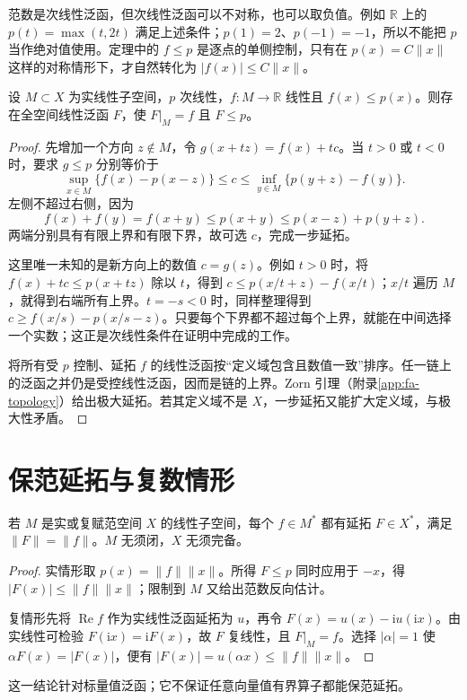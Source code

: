 \documentclass[UTF8,12pt,a4paper,fontset=fandol]{ctexbook}
\begin{document}
范数是次线性泛函，但次线性泛函可以不对称，也可以取负值。例如 $\mathbb R$ 上的 $p(t)=\max(t,2t)$ 满足上述条件；$p(1)=2$、$p(-1)=-1$，所以不能把 $p$ 当作绝对值使用。定理中的 $f\leq p$ 是逐点的单侧控制，只有在 $p(x)=C\|x\|$ 这样的对称情形下，才自然转化为 $|f(x)|\leq C\|x\|$。
\begin{theorem}\label{thm:fa-hahn-banach-real}
设 $M\subset X$ 为实线性子空间，$p$ 次线性，$f:M\to\mathbb R$ 线性且 $f(x)\leq p(x)$。则存在全空间线性泛函 $F$，使 $F|_M=f$ 且 $F\leq p$。
\end{theorem}
\begin{proof}
先增加一个方向 $z\notin M$，令 $g(x+tz)=f(x)+tc$。当 $t>0$ 或 $t<0$ 时，要求 $g\leq p$ 分别等价于
\[
 \sup_{x\in M}\{f(x)-p(x-z)\}\leq c
 \leq\inf_{y\in M}\{p(y+z)-f(y)\}.
\]
左侧不超过右侧，因为
\[
 f(x)+f(y)=f(x+y)\leq p(x+y)\leq p(x-z)+p(y+z).
\]
两端分别具有有限上界和有限下界，故可选 $c$，完成一步延拓。

这里唯一未知的是新方向上的数值 $c=g(z)$。例如 $t>0$ 时，将 $f(x)+tc\leq p(x+tz)$ 除以 $t$，得到 $c\leq p(x/t+z)-f(x/t)$；$x/t$ 遍历 $M$，就得到右端所有上界。$t=-s<0$ 时，同样整理得到 $c\geq f(x/s)-p(x/s-z)$。只要每个下界都不超过每个上界，就能在中间选择一个实数；这正是次线性条件在证明中完成的工作。

将所有受 $p$ 控制、延拓 $f$ 的线性泛函按“定义域包含且数值一致”排序。任一链上的泛函之并仍是受控线性泛函，因而是链的上界。Zorn 引理（附录\ref{app:fa-topology}）给出极大延拓。若其定义域不是 $X$，一步延拓又能扩大定义域，与极大性矛盾。
\end{proof}

\section{保范延拓与复数情形}
\begin{corollary}\label{cor:fa-norm-preserving-extension}
若 $M$ 是实或复赋范空间 $X$ 的线性子空间，每个 $f\in M^*$ 都有延拓 $F\in X^*$，满足 $\|F\|=\|f\|$。$M$ 无须闭，$X$ 无须完备。
\end{corollary}
\begin{proof}
实情形取 $p(x)=\|f\|\|x\|$。所得 $F\leq p$ 同时应用于 $-x$，得 $|F(x)|\leq\|f\|\|x\|$；限制到 $M$ 又给出范数反向估计。

复情形先将 $\operatorname{Re}f$ 作为实线性泛函延拓为 $u$，再令 $F(x)=u(x)-\mathrm i u(\mathrm ix)$。由实线性可检验 $F(\mathrm ix)=\mathrm iF(x)$，故 $F$ 复线性，且 $F|_M=f$。选择 $|\alpha|=1$ 使 $\alpha F(x)=|F(x)|$，便有 $|F(x)|=u(\alpha x)\leq\|f\|\|x\|$。
\end{proof}
这一结论针对标量值泛函；它不保证任意向量值有界算子都能保范延拓。
\end{document}

